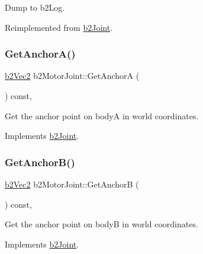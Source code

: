 Dump to b2\+Log. 



Reimplemented from \mbox{\hyperlink{classb2_joint_abd35e7316017ad9a40d5dbf9b5ba3f36}{b2\+Joint}}.

\mbox{\label{classb2_motor_joint_a58adfab0fe79d254347a367341b0963a}} 
\subsubsection{\texorpdfstring{GetAnchorA()}{GetAnchorA()}}
{\footnotesize\ttfamily \mbox{\hyperlink{structb2_vec2}{b2\+Vec2}} b2\+Motor\+Joint\+::\+Get\+AnchorA (\begin{DoxyParamCaption}{ }\end{DoxyParamCaption}) const\hspace{0.3cm}{\ttfamily [override]}, {\ttfamily [virtual]}}



Get the anchor point on bodyA in world coordinates. 



Implements \mbox{\hyperlink{classb2_joint_abe46ca3aad5db73909a9b5a7b2117447}{b2\+Joint}}.

\mbox{\label{classb2_motor_joint_a5d563fd070f7b6cfe8db6f83e1bebbcd}} 
\subsubsection{\texorpdfstring{GetAnchorB()}{GetAnchorB()}}
{\footnotesize\ttfamily \mbox{\hyperlink{structb2_vec2}{b2\+Vec2}} b2\+Motor\+Joint\+::\+Get\+AnchorB (\begin{DoxyParamCaption}{ }\end{DoxyParamCaption}) const\hspace{0.3cm}{\ttfamily [override]}, {\ttfamily [virtual]}}



Get the anchor point on bodyB in world coordinates. 



Implements \mbox{\hyperlink{classb2_joint_a88e947c65d4ea26fe539f02a8cb7f7a9}{b2\+Joint}}.

\mbox{\label{classb2_motor_joint_a4dc4e5ee4ec8615c3d712ea6cac48436}} 
